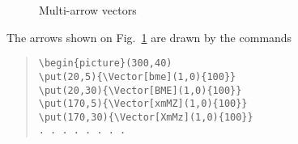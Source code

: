 \begin{figure}
\centerline{}
\caption{Multi-arrow vectors\label{TwoVec}}
\end{figure}

The arrows shown on Fig.~\ref{TwoVec} are drawn by the commands
\begin{quote}
\begin{verbatim}
\begin{picture}(300,40)
\put(20,5){\Vector[bme](1,0){100}}
\put(20,30){\Vector[BME](1,0){100}}
\put(170,5){\Vector[xmMZ](1,0){100}}
\put(170,30){\Vector[XmMz](1,0){100}}
. . . . . . . .
\end{verbatim}
\end{quote}

